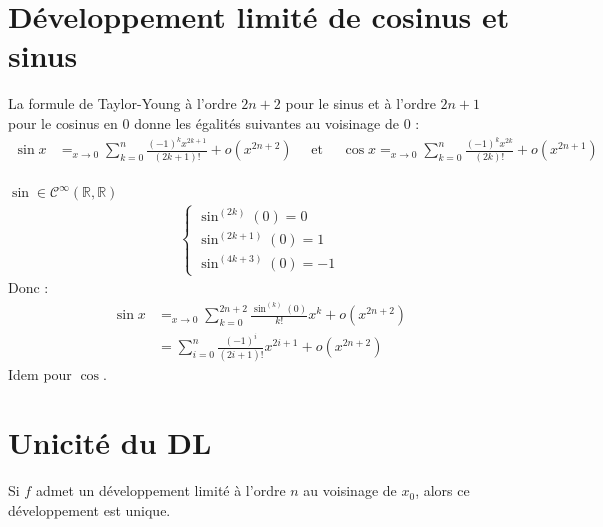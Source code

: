 \documentclass[../main.tex]{subfiles}
\begin{document}
\section{Développement limité de cosinus et sinus}
\begin{tcolorbox}[title=Propostion 25.30, title filled=false, colframe=lightblue, colback=lightblue!10!white]
    La formule de Taylor-Young à l'ordre $2n + 2$ pour le sinus et à l'ordre $2n + 1$ pour le cosinus en $0$ donne les égalités suivantes au voisinage de $0$ : 
    \begin{align*}
        \sin x &=_{x\to 0} \sum_{k=0}^{n} \frac{(-1)^k x^{2k+1}}{(2k+1)!} + o(x^{2n+2}) \quad \text{ et } \quad \cos x =_{x\to 0} \sum_{k=0}^{n} \frac{(-1)^k x^{2k}}{(2k)!} + o(x^{2n+1}) \\
    \end{align*}
\end{tcolorbox}

\noindent $\sin \in \mathcal{C}^{\infty}(\mathbb{R}, \mathbb{R})$
\begin{align*}
    \begin{cases}
        \sin^{(2k)}(0) = 0 \\
        \sin^{(2k+1)}(0) = 1 \\
        \sin^{(4k+3)}(0) = -1
    \end{cases}
\end{align*}
Donc : 
\begin{align*}
    \sin x &=_{x\to 0} \sum_{k=0}^{2n+2} \frac{\sin^{(k)}(0)}{k!}x^k + o(x^{2n+2}) \\
    &= \sum_{i=0}^{n} \frac{(-1)^i}{(2i+1)!}x^{2i+1} + o(x^{2n+2})
\end{align*}
Idem pour $\cos$.

\section{Unicité du DL}
\begin{tcolorbox}[title=Théorème 25.40, title filled=false, colframe=orange, colback=orange!10!white]
    Si $f$ admet un développement limité à l'ordre $n$ au voisinage de $x_0$, alors ce développement est unique. 
\end{tcolorbox}
\end{document}
